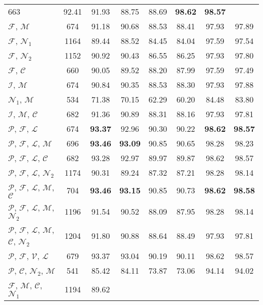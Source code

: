 \documentclass{llncs}
\begin{document}
\begin{table*}[htb]
\begin{tabular}{l c c c c c c c}
663 & 92.41 & 91.93 & 88.75 & 88.69 & \textbf{98.62} & \textbf{98.57} \\
 $\mathcal{F}$, $\mathcal{M}$ & 674 & 91.18 & 90.68 & 88.53 & 88.41 & 97.93 &
 97.89 \\ $\mathcal{F}$, $\mathcal{N}_1$ & 1164 & 89.44 & 88.52 & 84.45 & 84.04
 & 97.59 & 97.54 \\ $\mathcal{F}$, $\mathcal{N}_2$ & 1152 & 90.92 & 90.43 & 86.55
 & 86.25 & 97.93 & 97.80 \\ $\mathcal{F}$, $\mathcal{C}$ & 660 & 90.05 & 89.52 &
 88.20 & 87.99 & 97.59 & 97.49 \\ $\mathcal{I}$, $\mathcal{M}$ & 674 & 90.84 &
 90.35 & 88.53 & 88.30 & 97.93 & 97.88 \\ $\mathcal{N}_1$, $\mathcal{M}$ & 534 &
 71.38 & 70.15 & 62.29 & 60.20 & 84.48 & 83.80 \\ $\mathcal{I}$, $\mathcal{M}$,
$\mathcal{C}$ & 682 & 91.36 & 90.89 & 88.31 & 88.16 & 97.93 & 97.81 \\
$\mathcal{P}$, $\mathcal{F}$, $\mathcal{L}$ & 674 & \textbf{93.37} & 92.96 &
90.30 & 90.22 & \textbf{98.62} & \textbf{98.57} \\ $\mathcal{P}$, $\mathcal{F}$, $\mathcal{L}$,
$\mathcal{M}$ & 696 & \textbf{93.46} & \textbf{93.09} & 90.85 & 90.65 & 98.28 &
98.23 \\ $\mathcal{P}$, $\mathcal{F}$, $\mathcal{L}$, $\mathcal{C}$ & 682 &
93.28 & 92.97 & 89.97 & 89.87 & 98.62 & 98.57 \\ $\mathcal{P}$, $\mathcal{F}$,
$\mathcal{L}$, $\mathcal{N}_2$ & 1174 & 90.31 & 89.24 & 87.32 & 87.21 & 98.28 &
98.14 \\ $\mathcal{P}$, $\mathcal{F}$, $\mathcal{L}$, $\mathcal{M}$,
$\mathcal{C}$ & 704 & \textbf{93.46} & \textbf{93.15} & 90.85 & 90.73 &
\textbf{98.62} & \textbf{98.58} \\ $\mathcal{P}$, $\mathcal{F}$, $\mathcal{L}$, $\mathcal{M}$,
$\mathcal{N}_2$ & 1196 & 91.54 & 90.52 & 88.09 & 87.95 & 98.28 & 98.14 \\
$\mathcal{P}$, $\mathcal{F}$, $\mathcal{L}$, $\mathcal{M}$, $\mathcal{C}$,
$\mathcal{N}_2$ & 1204 & 91.80 & 90.88 & 88.64 & 88.49 & 97.93 & 97.81 \\
$\mathcal{P}$, $\mathcal{F}$, $\mathcal{V}$, $\mathcal{L}$ & 679 & 93.37 &
93.04 & 90.19 & 90.11 & 98.62 & 98.57 \\ $\mathcal{P}$, $\mathcal{C}$, $\mathcal{N}_2$,
$\mathcal{M}$ & 541 & 85.42 & 84.11 & 73.87 & 73.06 & 94.14 & 94.02 \\
$\mathcal{F}$, $\mathcal{M}$, $\mathcal{C}$, $\mathcal{N}_1$ & 1194 & 89.62 &

\end{tabular}
\end{table*}
\end{document}
